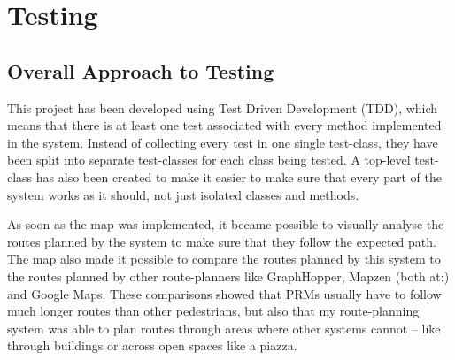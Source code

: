 \chapter{Testing}




\section{Overall Approach to Testing}
This project has been developed using Test Driven Development (TDD), which means that there is at least one test associated with every method implemented in the system. Instead of collecting every test in one single test-class, they have been split into separate test-classes for each class being tested. A top-level test-class has also been created to make it easier to make sure that every part of the system works as it should, not just isolated classes and methods.

As soon as the map was implemented, it became possible to visually analyse the routes planned by the system to make sure that they follow the expected path. The map also made it possible to compare the routes planned by this system to the routes planned by other route-planners like GraphHopper, Mapzen (both at:\cite{OSM}) and Google Maps\cite{GoogleMaps}. These comparisons showed that PRMs usually have to follow much longer routes than other pedestrians, but also that my route-planning system was able to plan routes through areas where other systems cannot -- like through buildings or across open spaces like a piazza.

